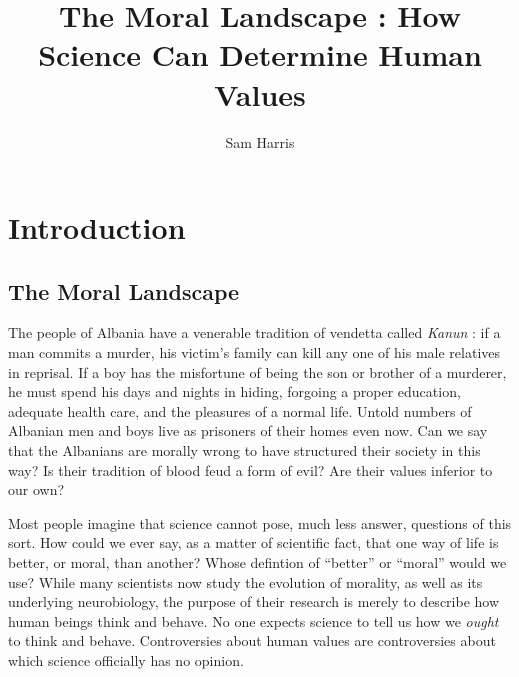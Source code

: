 \documentclass[a4paper,12pt]{extbook}
\title{The Moral Landscape : How Science Can Determine Human Values}
\author{Sam Harris}
\begin{document}
\maketitle
\tableofcontents

\newpage
\section{Introduction}

\subsection{The Moral Landscape}

The people of Albania have a venerable tradition of vendetta called \textit{Kanun} :
if a man commits a murder, his victim's family can kill any one of his male relatives in reprisal. 
If a boy has the misfortune of being the son or brother of a murderer, he must spend his days and nights in hiding, forgoing a proper education, adequate health care, and the pleasures of a normal life. 
Untold numbers of Albanian men and boys live as prisoners of their homes even now. 
Can we say that the Albanians are morally wrong to have structured their society in this way?
Is their tradition of blood feud a form of evil?
Are their values inferior to our own?

Most people imagine that science cannot pose, much less answer, questions of this sort. 
How could we ever say, as a matter of scientific fact, that one way of life is better, or moral, than another?
Whose defintion of ``better'' or ``moral'' would we use?
While many scientists now study the evolution of morality, as well as its underlying neurobiology, the purpose of their research is merely to describe how human beings think and behave. 
No one expects science to tell us how we \textit{ought} to think and behave. 
Controversies about human values are controversies about which science officially has no opinion. 
\end{document}
